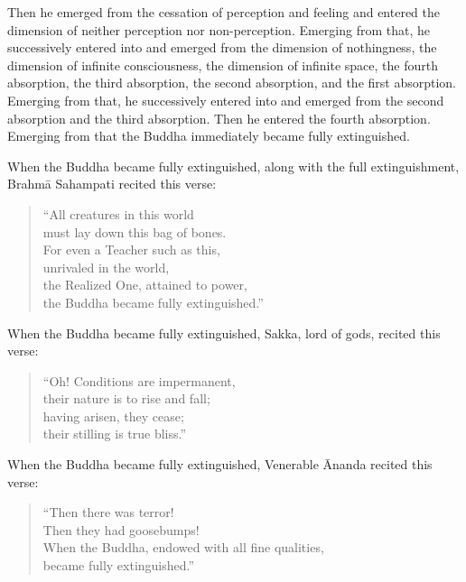 \documentclass[12pt,openany]{book}%
\begin{document}
Then he emerged from the cessation of perception and feeling and entered the dimension of neither perception nor non-perception. Emerging from that, he successively entered into and emerged from the dimension of nothingness, the dimension of infinite consciousness, the dimension of infinite space, the fourth absorption, the third absorption, the second absorption, and the first absorption. Emerging from that, he successively entered into and emerged from the second absorption and the third absorption. Then he entered the fourth absorption. Emerging from that the Buddha immediately became fully extinguished. 

When the Buddha became fully extinguished, along with the full extinguishment, \textsanskrit{Brahmā} Sahampati recited this verse: 

\begin{verse}%
“All creatures in this world \\
must lay down this bag of bones. \\
For even a Teacher such as this, \\
unrivaled in the world, \\
the Realized One, attained to power, \\
the Buddha became fully extinguished.” 

%
\end{verse}

When the Buddha became fully extinguished, Sakka, lord of gods, recited this verse: 

\begin{verse}%
“Oh! Conditions are impermanent, \\
their nature is to rise and fall; \\
having arisen, they cease; \\
their stilling is true bliss.” 

%
\end{verse}

When the Buddha became fully extinguished, Venerable Ānanda recited this verse: 

\begin{verse}%
“Then there was terror! \\
Then they had goosebumps! \\
When the Buddha, endowed with all fine qualities, \\
became fully extinguished.” 

%
\end{verse}
\end{document}
